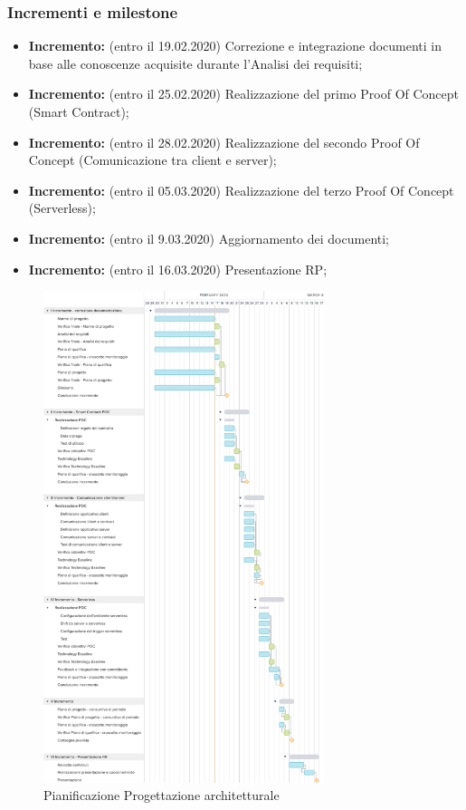 \subsubsection{Incrementi e milestone}
\begin{itemize}
	\item \textbf{ Incremento:} (entro il 19.02.2020) Correzione e integrazione documenti in base alle conoscenze acquisite durante l'Analisi dei requisiti;
	\item \textbf{ Incremento:} (entro il 25.02.2020) Realizzazione del primo Proof Of Concept (Smart Contract);
	\item \textbf{ Incremento:} (entro il 28.02.2020) Realizzazione del secondo Proof Of Concept (Comunicazione tra client e server);
	\item \textbf{ Incremento:} (entro il 05.03.2020) Realizzazione del terzo Proof Of Concept (Serverless);
	\item \textbf{ Incremento:} (entro il 9.03.2020) Aggiornamento dei documenti;
	\item \textbf{ Incremento:} (entro il 16.03.2020) Presentazione RP;
\end{itemize}
\begin{figure}[h!]
	\includegraphics[width=310px]{res/img/plan2}
	\caption{Pianificazione Progettazione architetturale}
\end{figure}
\newpage

